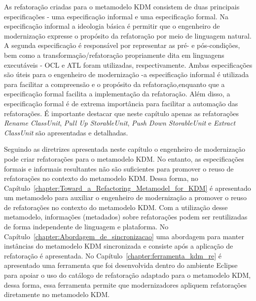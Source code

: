As refatoração criadas para o metamodelo KDM consistem de duas principais especificações - uma especificação informal e uma especificação formal. Na especificação informal a ideologia básica é permitir que o engenheiro de modernização expresse o propósito da refatoração por meio de linguagem natural. A segunda especificação é responsável por representar as pré- e pós-condições, bem como a transformação/refatoração propriamente dita em linguagens executáveis - OCL e ATL foram utilizadas, respectivamente. Ambas especificações são úteis para o engenheiro de modernização -a especificação informal é utilizada para facilitar a compreensão e o propósito da refatoração,enquanto que a especificação formal facilita a implementação da refatoração. Além disso, a especificação formal é de extrema importância para facilitar a automação das refatorações. É importante destacar que neste capítulo apenas as refatorações \textit{Rename ClassUnit}, \textit{Pull Up StorableUnit}, \textit{Push Down StorableUnit} e \textit{Extract ClassUnit} são apresentadas e detalhadas.

Seguindo as diretrizes apresentada neste capítulo o engenheiro de modernização pode criar refatorações para o metamodelo KDM. No entanto, as especificações formais e informais resultantes não são suficientes para promover o reuso de refatorações no contexto do metamodelo KDM. Dessa forma, no Capítulo~\ref{chapter:Toward_a_Refactoring_Metamodel_for_KDM} é apresentado um metamodelo para auxiliar o engenheiro de modernização a promover o reuso de refatorações no contexto do metamodelo KDM. Com a utilização desse metamodelo, informações (metadados) sobre refatorações podem ser reutilizadas de forma independente de linguagem e plataforma. No Capítulo~\ref{chapter:Abordagem_de_sincronizacao} uma abordagem para manter instâncias do metamodelo KDM sincronizada e consiste após a aplicação de refatoração é apresentada. No Capítulo~\ref{chapter:ferramenta_kdm_re} é apresentado uma ferramenta que foi desenvolvida dentro do ambiente Eclipse para apoiar o uso do catálogo de refatoração adaptado para o metamodelo KDM, dessa forma, essa ferramenta permite que modernizadores apliquem refatorações diretamente no metamodelo KDM. 
